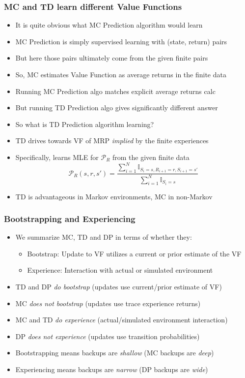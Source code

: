 \documentclass[handout]{beamer}
\begin{document}
\begin{frame}
\frametitle{MC and TD learn different Value Functions}
\pause
\begin{itemize}[<+->]
\item It is quite obvious what MC Prediction algorithm would learn
\item MC Prediction is simply supervised learning with (state, return) pairs
\item But here those pairs ultimately come from the given finite pairs
\item So, MC estimates Value Function as average returns in the finite data
\item Running MC Prediction algo matches explicit average returns calc
\item But running TD Prediction algo gives significantly different answer
\item So what is TD Prediction algorithm learning?
\item TD drives towards VF of MRP {\em implied} by the finite experiences
\item Specifically, learns MLE for $\mathcal{P}_R$ from the given finite data
$$\mathcal{P}_R(s,r,s') = \frac {\sum_{i=1}^N \mathbb{I}_{S_i=s,R_{i+1}=r,S_{i+1}=s'}} {\sum_{i=1}^N \mathbb{I}_{S_i=s}}$$
\item TD is advantageous in Markov environments, MC in non-Markov
\end{itemize}
\end{frame}

\begin{frame}
\frametitle{Bootstrapping and Experiencing}
\pause
\begin{itemize}[<+->]
\item We summarize MC, TD and DP in terms of whether they:
\begin{itemize}[<+->]
\item Bootstrap:  Update to VF utilizes a current or prior estimate of the VF
\item Experience: Interaction with actual or simulated environment
\end{itemize}
\item TD and DP {\em do bootstrap} (updates use current/prior estimate of VF)
\item MC {\em does not bootstrap} (updates use trace experience returns)
\item MC and TD {\em do experience} (actual/simulated environment interaction)
\item DP {\em does not experience} (updates use transition probabilities)
\item Bootstrapping means backups are {\em shallow} (MC backups are {\em deep})
\item Experiencing means backups are {\em narrow} (DP backups are {\em wide})
\end{itemize}
\end{frame}
\end{document}
